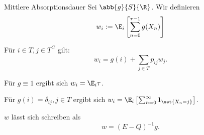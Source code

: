 \begin{karte}{Mittlere Absorptionsdauer}
    Sei \(\abb{g}{S}{\R}\). Wir definieren 
    \[ w_i := \E_i \left[ \sum_{n=0}^{\tau - 1} g(X_n) \right] \]

    Für \(i\in T, j\in T^C\) gilt: 
    \[ w_i = g(i) + \sum_{j\in T} p_{ij} w_j. \]

    Für \(g \equiv 1\) ergibt sich \(w_i = \E_i \tau\).
    
    Für \(g(i) = \delta_{ij}, j\in T\) ergibt sich \(w_i = \E_i \left[\sum_{n=0}^\infty 1_{\set{X_n = j}}\right]\).

    \(w\) lässt sich schreiben als 
    \[ w = (E - Q)^{-1} g. \]
\end{karte}

\begin{karte}{}

\end{karte}

\begin{karte}{}

\end{karte}

\begin{karte}{}

\end{karte}

\begin{karte}{}

\end{karte}

\begin{karte}{}

\end{karte}

\begin{karte}{}

\end{karte}